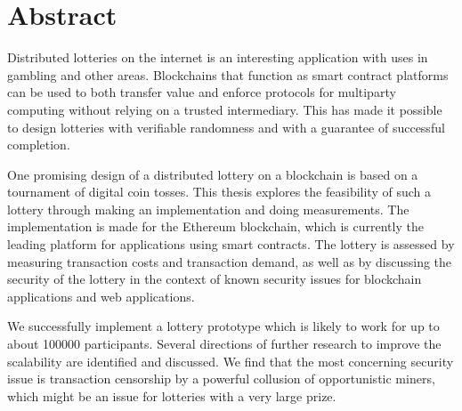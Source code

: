 \chapter*{Abstract}

Distributed lotteries on the internet is an interesting application with uses in gambling and other areas. Blockchains that function as smart contract platforms can be used to both transfer value and enforce protocols for multiparty computing without relying on a trusted intermediary. This has made it possible to design lotteries with verifiable randomness and with a guarantee of successful completion. 

One promising design of a distributed lottery on a blockchain is based on a tournament of digital coin tosses. This thesis explores the feasibility of such a lottery through making an implementation and doing measurements. The implementation is made for the Ethereum blockchain, which is currently the leading platform for applications using smart contracts. The lottery is assessed by measuring transaction costs and transaction demand, as well as by discussing the security of the lottery in the context of known security issues for blockchain applications and web applications.

We successfully implement a lottery prototype which is likely to work for up to about 100000 participants. Several directions of further research to improve the scalability are identified and discussed. We find that the most concerning security issue is transaction censorship by a powerful collusion of opportunistic miners, which might be an issue for lotteries with a very large prize.

\hypersetup{pageanchor=false}
